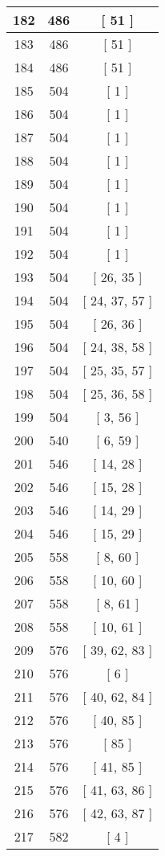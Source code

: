 \begin{center}
\begin{longtable}[H]{|| c c c ||}
\hline
182 & 486 & [ 51 ] \\ 
\hline
183 & 486 & [ 51 ] \\ 
\hline
184 & 486 & [ 51 ] \\ 
\hline
185 & 504 & [ 1 ] \\ 
\hline
186 & 504 & [ 1 ] \\ 
\hline
187 & 504 & [ 1 ] \\ 
\hline
188 & 504 & [ 1 ] \\ 
\hline
189 & 504 & [ 1 ] \\ 
\hline
190 & 504 & [ 1 ] \\ 
\hline
191 & 504 & [ 1 ] \\ 
\hline
192 & 504 & [ 1 ] \\ 
\hline
193 & 504 & [ 26, 35 ] \\ 
\hline
194 & 504 & [ 24, 37, 57 ] \\ 
\hline
195 & 504 & [ 26, 36 ] \\ 
\hline
196 & 504 & [ 24, 38, 58 ] \\ 
\hline
197 & 504 & [ 25, 35, 57 ] \\ 
\hline
198 & 504 & [ 25, 36, 58 ] \\ 
\hline
199 & 504 & [ 3, 56 ] \\ 
\hline
200 & 540 & [ 6, 59 ] \\ 
\hline
201 & 546 & [ 14, 28 ] \\ 
\hline
202 & 546 & [ 15, 28 ] \\ 
\hline
203 & 546 & [ 14, 29 ] \\ 
\hline
204 & 546 & [ 15, 29 ] \\ 
\hline
205 & 558 & [ 8, 60 ] \\ 
\hline
206 & 558 & [ 10, 60 ] \\ 
\hline
207 & 558 & [ 8, 61 ] \\ 
\hline
208 & 558 & [ 10, 61 ] \\ 
\hline
209 & 576 & [ 39, 62, 83 ] \\ 
\hline
210 & 576 & [ 6 ] \\ 
\hline
211 & 576 & [ 40, 62, 84 ] \\ 
\hline
212 & 576 & [ 40, 85 ] \\ 
\hline
213 & 576 & [ 85 ] \\ 
\hline
214 & 576 & [ 41, 85 ] \\ 
\hline
215 & 576 & [ 41, 63, 86 ] \\ 
\hline
216 & 576 & [ 42, 63, 87 ] \\ 
\hline
217 & 582 & [ 4 ] \\ 

\end{longtable}
\end{center}
